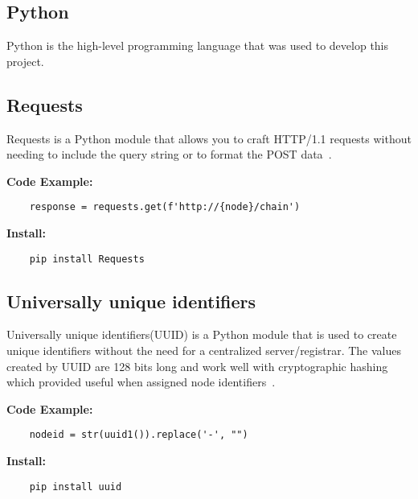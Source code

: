 \subsection{Python}

Python is the high-level programming language that was used to develop
this project.

\subsection{Requests}

Requests is a Python module that allows you to craft HTTP/1.1 requests
without needing to include the query string or to format the POST
data~\cite{hid-sp18-414-www-requests-HTTP}.

\bigskip
\noindent
\textbf{Code Example:}
\begin{footnotesize}
\begin{verbatim}
    response = requests.get(f'http://{node}/chain')
\end{verbatim}
\end{footnotesize}
\noindent
\textbf{Install:}
\begin{footnotesize}
\begin{verbatim}
    pip install Requests
\end{verbatim}
\end{footnotesize}

\subsection{Universally unique identifiers}

Universally unique identifiers(UUID) is a Python module that is used
to create unique identifiers without the need for a centralized
server/registrar. The values created by UUID are 128 bits long and
work well with cryptographic hashing which provided useful when
assigned node identifiers~\cite{hid-sp18-414-www-uuid-objects}.

\bigskip
\noindent
\textbf{Code Example:}
\begin{footnotesize}
\begin{verbatim}
    nodeid = str(uuid1()).replace('-', "")
\end{verbatim}
\end{footnotesize}
\noindent
\textbf{Install:}
\begin{footnotesize}
\begin{verbatim}
    pip install uuid
\end{verbatim}
\end{footnotesize}

